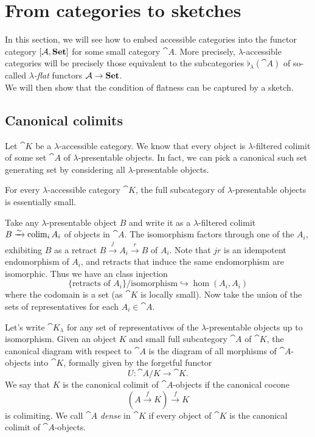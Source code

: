 \section{From categories to sketches}
\label{seq:catstoskeches}

In this section, we will see how to embed accessible categories into the functor category $[\mathcal{A},\mathbf{Set}]$ for some small category $\cat A$. More precisely, $\lambda$-accessible categories will be precisely those equivalent to the subcategories $\flat_\lambda(\cat A)$ of so-called \emph{$\lambda$-flat} functors $\mathcal{A} \to \mathbf{Set}$. \\

We will then show that the condition of flatness can be captured by a sketch.

\subsection{Canonical colimits}

Let $\cat K$ be a $\lambda$-accessible category. We know that every object is $\lambda$-filtered colimit of some set $\cat A$ of $\lambda$-presentable objects. In fact, we can pick a canonical such set generating set by considering all $\lambda$-presentable objects.

\begin{Proposition}
For every $\lambda$-accessible category $\cat K$, the full subcategory of $\lambda$-presentable objects is essentially small. 
\end{Proposition}
\begin{Proof}
Take any $\lambda$-presentable object $B$ and write it as a $\lambda$-filtered colimit $B \xrightarrow{\sim} \operatorname{colim}_i A_i$ of objects in $\cat A$. The isomorphism factors through one of the $A_i$, exhibiting $B$ as a retract $B \xrightarrow{j} A_i \xrightarrow{r} B$ of $A_i$. Note that $jr$ is an idempotent endomorphism of $A_i$, and retracts that induce the same endomorphism are isomorphic. Thus we have an class injection
\[ \{ \text{retracts of } A_i \}/\text{isomorphism} \hookrightarrow \hom(A_i,A_i) \]
where the codomain is a set (as $\cat K$ is locally small). Now take the union of the sets of representatives for each $A_i \in \cat A$.
\end{Proof}

Let's write $\cat K_\lambda$ for any set of representatives of the $\lambda$-presentable objects up to isomorphism. Given an object $K$ and small full subcategory $\cat A$ of $\cat K$, the canonical diagram with respect to $\cat A$ is the diagram of all morphisms of $\cat A$-objects into $\cat K$, formally given by the forgetful functor
\[ U : \cat A/K \to \cat K. \]
We say that $K$ is the canonical colimit of $\cat A$-objects if the canonical cocone
\[ (A \xrightarrow{f} K) \xrightarrow{f} K \]
is colimiting. We call $\cat A$ \emph{dense} in $\cat K$ if every object of $\cat K$ is the canonical colimit of $\cat A$-objects.

